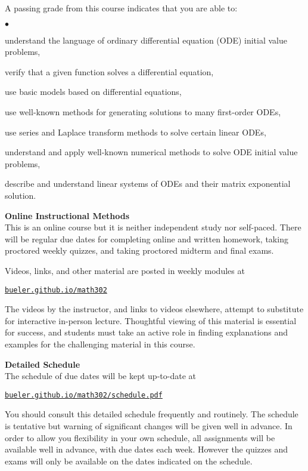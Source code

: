 \documentclass[12pt]{article}
\renewcommand{\emph}[1]{\textsf{\textbf{#1}}}
\newcommand{\localhead}[1]{\par\smallskip\textbf{#1}\nobreak\\}%
\def\heading#1{\localhead{\large\emph{#1}}}
\newenvironment{clist}%
{\bgroup\parskip 0pt\begin{list}{$\bullet$}{\partopsep 4pt\topsep 0pt\itemsep -2pt}}%
{\end{list}\egroup}%
\begin{document}
A passing grade from this course indicates that you are able to:

\begin{clist}
\item understand the language of ordinary differential equation (ODE) initial value problems,
\item verify that a given function solves a differential equation,
\item use basic models based on differential equations,
\item use well-known methods for generating solutions to many first-order ODEs,
\item use series and Laplace transform methods to solve certain linear ODEs,
\item understand and apply well-known numerical methods to solve ODE initial value problems,
\item describe and understand linear systems of ODEs and their matrix exponential solution.
\end{clist}

\heading{Online Instructional Methods}
This is an online course but it is neither independent study nor self-paced.  There will be regular due dates for completing online and written homework, taking proctored weekly quizzes, and taking proctored midterm and final exams.

Videos, links, and other material are posted in weekly modules at

\smallskip
\centerline{\href{https://bueler.github.io/math302/}{\tt bueler.github.io/math302}}

The videos by the instructor, and links to videos elsewhere, attempt to substitute for interactive in-person lecture.  Thoughtful viewing of this material is essential for success, and students must take an active role in finding explanations and examples for the challenging material in this course.


\heading{Detailed Schedule}
The schedule of due dates will be kept up-to-date at

\smallskip
\centerline{\href{https://bueler.github.io/math302/schedule.pdf}{\tt bueler.github.io/math302/schedule.pdf}}

You should consult this detailed schedule frequently and routinely.  The schedule is tentative but warning of significant changes will be given well in advance.  In order to allow you flexibility in your own schedule, all assignments will be available well in advance, with due dates each week.  However the quizzes and exams will only be available on the dates indicated on the schedule.
\end{document}
